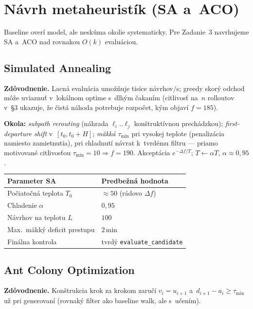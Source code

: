 \documentclass[11pt,a4paper]{article}
\begin{document}
\section{Návrh metaheuristík (SA a~ACO)}

Baseline overí model, ale neskúma okolie systematicky. Pre Zadanie~3
navrhujeme SA a~ACO nad rovnakou $O(k)$ evaluáciou.

\subsection{Simulated Annealing}

\textbf{Zdôvodnenie.} Lacná evaluácia umožňuje tisíce návrhov/s;
greedy skorý odchod môže uviaznuť v~lokálnom optime s~dlhým čakaním
(citlivosť na~$n$ rolloutov v~§3 ukazuje, že čistá náhoda potrebuje
rozpočet, kým objaví $f=185$).

\textbf{Okola:} \emph{subpath rerouting} (náhrada $\ell_i..\ell_j$
konštruktívnou prechádzkou); \emph{first-departure shift} v~$[t_0,t_0+H]$;
\emph{mäkká $\tau_{\min}$} pri vysokej teplote (penalizácia namiesto
zamietnutia), pri chladnutí návrat k~tvrdému filtru --- priamo motivované
citlivosťou $\tau_{\min}=10\Rightarrow f=190$.
Akceptácia $e^{-\Delta f/T}$; $T\leftarrow\alpha T$, $\alpha\approx0{,}95$.

\begin{center}
\small
\begin{tabular}{@{}ll@{}}
\toprule
Parameter SA & Predbežná hodnota \\
\midrule
Počiatočná teplota $T_0$ & $\approx 50$ (rádovo $\Delta f$) \\
Chladenie $\alpha$ & $0{,}95$ \\
Návrhov na teplotu $L$ & $100$ \\
Max.\ mäkký deficit prestupu & $2$\,min \\
Finálna kontrola & tvrdý \texttt{evaluate\_candidate} \\
\bottomrule
\end{tabular}
\end{center}

\subsection{Ant Colony Optimization}

\textbf{Zdôvodnenie.} Konštrukcia krok za krokom zaručí
$v_i=u_{i+1}$ a~$d_{i+1}-a_i\ge\tau_{\min}$ už pri generovaní
(rovnaký filter ako baseline walk, ale s~učením).
\end{document}
